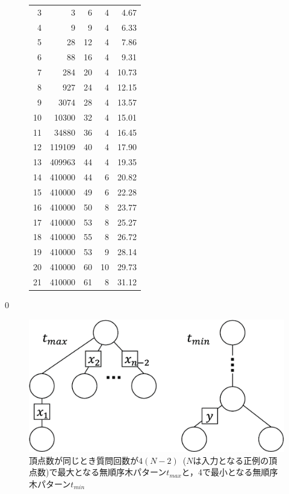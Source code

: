 \begin{figure}[tb]
\begin{center}
\begin{tabular}{rrrrr}
          3 &      3 &     6 &     4 &  4.67 \\
          4 &      9 &     9 &     4 &  6.33 \\
          5 &     28 &    12 &     4 &  7.86 \\
          6 &     88 &    16 &     4 &  9.31 \\
          7 &    284 &    20 &     4 & 10.73 \\
          8 &    927 &    24 &     4 & 12.15 \\
          9 &   3074 &    28 &     4 & 13.57 \\
         10 &  10300 &    32 &     4 & 15.01 \\
         11 &  34880 &    36 &     4 & 16.45 \\
         12 & 119109 &    40 &     4 & 17.90 \\
         13 & 409963 &    44 &     4 & 19.35 \\
         14 & 410000 &    44 &     6 & 20.82 \\
         15 & 410000 &    49 &     6 & 22.28 \\
         16 & 410000 &    50 &     8 & 23.77 \\
         17 & 410000 &    53 &     8 & 25.27 \\
         18 & 410000 &    55 &     8 & 26.72 \\
         19 & 410000 &    53 &     9 & 28.14 \\
         20 & 410000 &    60 &    10 & 29.73 \\
         21 & 410000 &    61 &     8 & 31.12 \\ \hline
    \end{tabular}
  \end{center}
\end{figure}
0
\begin{figure}[tb]
  \centering
  \includegraphics[scale=0.34]{fig/fig-qltimes_max_min.eps}
  \caption{頂点数が同じとき質問回数が$4(N-2)$~($N$は入力となる正例の頂点数)で最大となる無順序木パターン$t_{max}$と，4で最小となる無順序木パターン$t_{min}$}\label{fig:qltimes_max_min}
\end{figure}

